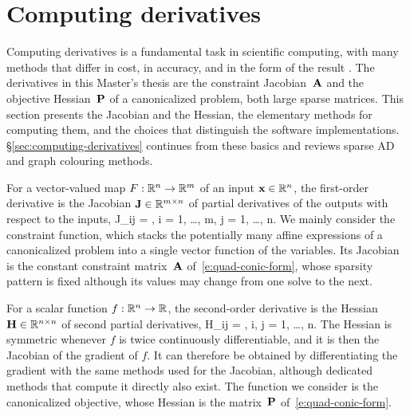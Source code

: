 \section{Computing derivatives}\label{sec:bg-derivatives}

Computing derivatives is a fundamental task in scientific computing, with many methods that
differ in cost, in accuracy, and in the form of the result \cite{baydin2017ADsurvey}.
The derivatives in this Master's thesis are the constraint Jacobian~$\mathbf{A}$ and the objective
Hessian~$\mathbf{P}$ of a canonicalized problem, both large sparse matrices.
This section presents the Jacobian and the Hessian, the elementary methods for computing them,
and the choices that distinguish the software implementations.
\S\ref{sec:computing-derivatives} continues from these basics and reviews sparse AD and
graph colouring methods.

For a vector-valued map $F : \mathbb{R}^n \to \mathbb{R}^m$ of an input $\mathbf{x} \in \mathbb{R}^n$, the
first-order
derivative is the Jacobian $\mathbf{J} \in \mathbb{R}^{m \times n}$ of partial derivatives of
the outputs
with respect to the inputs,
\BEQ\label{eq:jacobian}
  J_{ij} = , \qquad i = 1, \dots, m, \quad j = 1, \dots, n.
\EEQ
We mainly consider the constraint function, which stacks the potentially many affine
expressions of a canonicalized problem into a single vector function of the variables.
Its Jacobian is the constant constraint matrix~$\mathbf{A}$ of~\eqref{e:quad-conic-form}, whose
sparsity
pattern is fixed although its values may change from one solve to the next.

For a scalar function $f : \mathbb{R}^n \to \mathbb{R}$, the second-order derivative is the Hessian
$\mathbf{H} \in \mathbb{R}^{n \times n}$ of second partial derivatives,
\BEQ\label{eq:hessian}
  H_{ij} = , \qquad i, j = 1, \dots, n.
\EEQ
The Hessian is symmetric whenever $f$ is twice continuously differentiable, and it is then
the Jacobian of the gradient of $f$.
It can therefore be obtained by differentiating the gradient with the
same methods used for the Jacobian, although dedicated methods that compute it directly also exist.
The function we consider is the canonicalized objective, whose Hessian is the matrix~$\mathbf{P}$
of~\eqref{e:quad-conic-form}.


